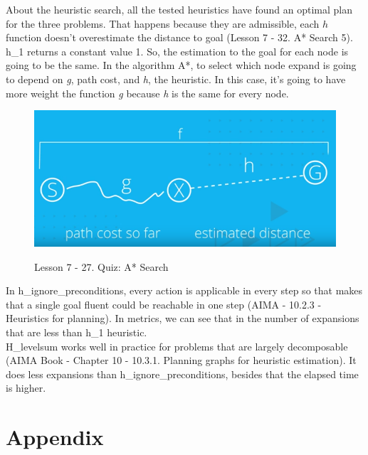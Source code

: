 \documentclass[10pt, a4paper,english]{article}
\begin{document}
About the heuristic search, all the tested heuristics have found an optimal plan for the three problems. That happens because they are admissible, each $h$ function doesn't overestimate the distance to goal (Lesson 7 - 32. A* Search 5). \\

h\_1 returns a constant value 1. So, the estimation to the goal for each node is going to be the same. In the algorithm A*, to select which node expand is going to depend on \textit{g}, path cost, and \textit{h}, the heuristic. In this case, it's going to have more weight the function \textit{g} because \textit{h} is the same for every node.\\

\begin{figure}[H]
\begin{center}
\includegraphics[width=1\textwidth]{asearch.png}\\
\caption{Lesson 7 - 27. Quiz: A* Search}
\end{center}
\end{figure}

In h\_ignore\_preconditions, every action is applicable in every step so that makes that a single goal fluent could be reachable in one step (AIMA - 10.2.3 - Heuristics for planning). In metrics, we can see that in the number of expansions that are less than h\_1 heuristic. \\

H\_levelsum works well in practice for problems that are largely decomposable (AIMA Book - Chapter 10 - 10.3.1. Planning graphs for heuristic estimation). It does less expansions than h\_ignore\_preconditions, besides that the elapsed time is higher. \\

\section{Appendix}
\end{document}
